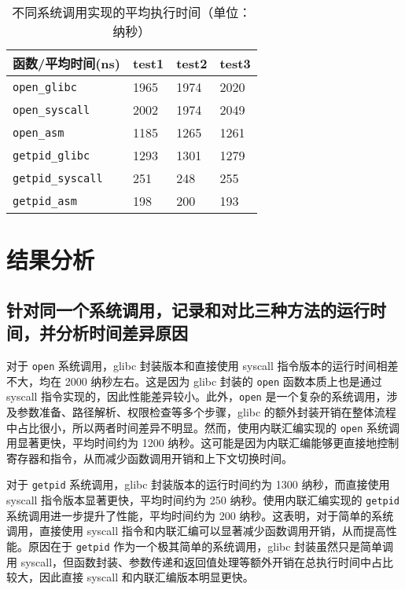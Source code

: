\documentclass[11pt]{article}
\begin{document}
\begin{table}[H]
    \centering
    \renewcommand{\arraystretch}{1.5}
    \begin{tabularx}{0.8\textwidth}{l X X X}
        \toprule
        \textbf{函数/平均时间(ns)} & \textbf{test1} & \textbf{test2} & \textbf{test3} \\
        \midrule
        \texttt{open\_glibc}    & 1965 & 1974 & 2020 \\
        \texttt{open\_syscall}  & 2002 & 1974 & 2049 \\
        \texttt{open\_asm}      & 1185 & 1265 & 1261 \\
        \texttt{getpid\_glibc}  & 1293 & 1301 & 1279 \\
        \texttt{getpid\_syscall}& 251  & 248  & 255  \\
        \texttt{getpid\_asm}    & 198  & 200  & 193  \\
        \bottomrule
    \end{tabularx}
    \caption{不同系统调用实现的平均执行时间（单位：纳秒）}
\end{table}

\section{结果分析}
\subsection{针对同一个系统调用，记录和对比三种方法的运行时间，并分析时间差异原因}
对于 \texttt{open} 系统调用，glibc 封装版本和直接使用 syscall 指令版本的运行时间相差不大，均在 2000 纳秒左右。这是因为 glibc 封装的 \texttt{open} 函数本质上也是通过 syscall 指令实现的，因此性能差异较小。此外，\texttt{open} 是一个复杂的系统调用，涉及参数准备、路径解析、权限检查等多个步骤，glibc 的额外封装开销在整体流程中占比很小，所以两者时间差异不明显。然而，使用内联汇编实现的 \texttt{open} 系统调用显著更快，平均时间约为 1200 纳秒。这可能是因为内联汇编能够更直接地控制寄存器和指令，从而减少函数调用开销和上下文切换时间。

对于 \texttt{getpid} 系统调用，glibc 封装版本的运行时间约为 1300 纳秒，而直接使用 syscall 指令版本显著更快，平均时间约为 250 纳秒。使用内联汇编实现的 \texttt{getpid} 系统调用进一步提升了性能，平均时间约为 200 纳秒。这表明，对于简单的系统调用，直接使用 syscall 指令和内联汇编可以显著减少函数调用开销，从而提高性能。原因在于 \texttt{getpid} 作为一个极其简单的系统调用，glibc 封装虽然只是简单调用 syscall，但函数封装、参数传递和返回值处理等额外开销在总执行时间中占比较大，因此直接 syscall 和内联汇编版本明显更快。
\end{document}

